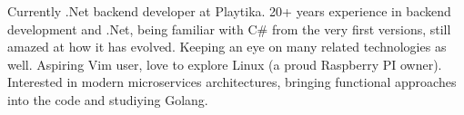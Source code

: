 

\begin{cvparagraph}

Currently .Net backend developer at Playtika. 20+ years experience in backend development and .Net, being familiar with C\# from the very first versions, still amazed at how it has evolved. Keeping an eye on many related technologies as well. Aspiring Vim user, love to explore Linux (a proud Raspberry PI owner). Interested in modern microservices architectures, bringing functional approaches into the code and studiying Golang.
\end{cvparagraph}
